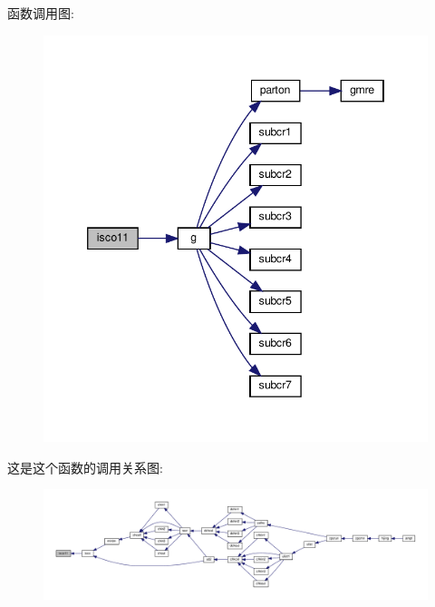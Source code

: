 函数调用图\+:
\nopagebreak
\begin{figure}[H]
\begin{center}
\leavevmode
\includegraphics[width=346pt]{isco11_8f90_a5cbe0a24fa3ffefc5968f91bbc94b877_cgraph}
\end{center}
\end{figure}
这是这个函数的调用关系图\+:
\nopagebreak
\begin{figure}[H]
\begin{center}
\leavevmode
\includegraphics[width=350pt]{isco11_8f90_a5cbe0a24fa3ffefc5968f91bbc94b877_icgraph}
\end{center}
\end{figure}
